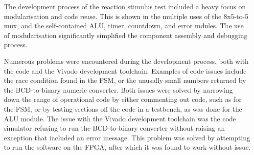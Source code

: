 \documentclass[11pt]{article}
\begin{document}
The development process of the reaction stimulus test included a heavy focus on modularisation and code reuse. This is shown in the multiple uses of the 8x5-to-5 mux, and the self-contained ALU, timer, countdown, and error mdules. The use of modularisation significantly simplified the component assembly and debugging process.

Numerous problems were encountered during the development process, both with the code and the Vivado development toolchain. Examples of code issues include the race condition found in the FSM, or the unusally small numbers returned by the BCD-to-binary numeric converter. Both issues were solved by narrowing down the range of operational code by either commenting out code, such as for the FSM, or by testing sections off the code in a testbench, as was done for the ALU module. The issue with the Vivado development toolchain was the code simulator refusing to run the BCD-to-binary converter without raising an exception that included an error message. This problem was solved by attempting to run the software on the FPGA, after which it was found to work without issue.

%
%
%
\newpage
\end{document}

